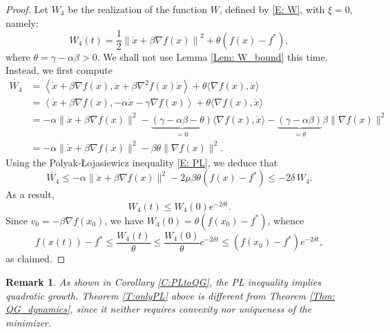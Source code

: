 \documentclass[pdflatex,sn-mathphys-num]{sn-jnl}
\theoremstyle{thmstyleone}
\theoremstyle{thmstyletwo}
\newtheorem{remark}{Remark}
\theoremstyle{thmstylethree}
\begin{document}
\begin{proof}
Let $W_4$ be the realization of the function $W$, defined by \eqref{E: W}, with $\xi=0$, namely:
$$W_4(t) = \frac{1}{2}\left\| \dot{x} + \beta\nabla f(x) \right\|^2 + \theta\left( f(x) - f^* \right),$$
where $\theta=\gamma-\alpha\beta>0$. We shall not use Lemma \ref{Lem: W_bound} this time. Instead, we first compute
\begin{align*}
\dot{W_4} 
&= \left\langle \dot{x} + \beta\nabla f(x), \ddot{x} + \beta\nabla^2 f(x)\dot{x} \right\rangle
  + \theta \langle \nabla f(x), \dot{x} \rangle \\
&= \left\langle \dot{x} + \beta\nabla f(x), -\alpha\dot{x} - \gamma\nabla f(x) \right\rangle
  + \theta \langle \nabla f(x), \dot{x} \rangle \\
&= -\alpha \| \dot{x} + \beta\nabla f(x) \|^2
   - \underbrace{(\gamma-\alpha\beta-\theta)}_{=0}\langle \nabla f(x), \dot{x} \rangle
   - \underbrace{(\gamma-\alpha\beta)}_{=\theta}\beta\| \nabla f(x) \|^2 \\
&= -\alpha \| \dot{x} + \beta\nabla f(x) \|^2 - \beta\theta \| \nabla f(x) \|^2. 
\end{align*}
Using the Polyak-\L ojasiewicz inequality \eqref{E: PL}, we deduce that
$$\dot{W_4}
\le -\alpha \| \dot{x} + \beta\nabla f(x) \|^2 - 2\mu\beta\theta \left( f(x) - f^* \right) 
\le - 2\delta\,W_4.$$
As a result,
$$ W_4(t) \le W_4(0) e^{-2\delta t}. $$
Since $v_0 = -\beta\nabla f(x_0)$, we have $W_4(0)=\theta\left( f(x_0) - f^* \right)$, whence
$$ f\left( x(t) \right) - f^* \le \frac{W_4(t)}{\theta} \le \frac{W_4(0)}{\theta}e^{-2\delta t} \le \left( f(x_0) - f^* \right)e^{-2\delta t}, $$
as claimed.
\end{proof}


\begin{remark}
As shown in Corollary \ref{C:PLtoQG}, the P{\L} inequality implies quadratic growth. Theorem \ref{T:onlyPL} above is different from Theorem \ref{Thm: QG_dynamics}, since it neither requires convexity nor uniqueness of the minimizer. 
\end{remark}




\end{document}
